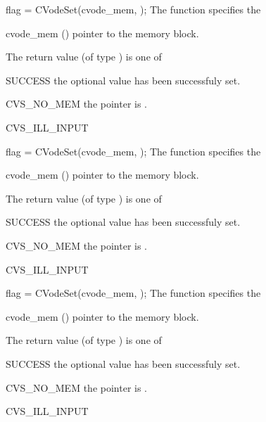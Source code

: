 {}
{
flag = CVodeSet(cvode\_mem, );
}
{
  The function  specifies the
}
{
  \begin{args}
  \item[cvode\_mem] ()
    pointer to the {\cvodes} memory block.
  \item[]
    
  \end{args}
}
{
  The return value  (of type ) is one of
  \begin{args}
  \item[SUCCESS] 
    the optional value has been successfuly set.
  \item[CVS\_NO\_MEM]
    the  pointer is .
  \item[CVS\_ILL\_INPUT]
    
  \end{args}
}
{}
{
flag = CVodeSet(cvode\_mem, );
}
{
  The function  specifies the
}
{
  \begin{args}
  \item[cvode\_mem] ()
    pointer to the {\cvodes} memory block.
  \item[]
    
  \end{args}
}
{
  The return value  (of type ) is one of
  \begin{args}
  \item[SUCCESS] 
    the optional value has been successfuly set.
  \item[CVS\_NO\_MEM]
    the  pointer is .
  \item[CVS\_ILL\_INPUT]
    
  \end{args}
}
{}
{
flag = CVodeSet(cvode\_mem, );
}
{
  The function  specifies the
}
{
  \begin{args}
  \item[cvode\_mem] ()
    pointer to the {\cvodes} memory block.
  \item[]
    
  \end{args}
}
{
  The return value  (of type ) is one of
  \begin{args}
  \item[SUCCESS] 
    the optional value has been successfuly set.
  \item[CVS\_NO\_MEM]
    the  pointer is .
  \item[CVS\_ILL\_INPUT]
    
  \end{args}
}
